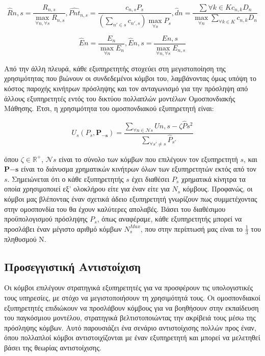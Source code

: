 \[\hat{R}{n,s} = \frac{R_{n,s}}{\max \limits_{\forall n, \forall s} { R_{n,s} }}, \hat{Pnt}_{n,s} = \frac{c_{n,s}P_s}{(\sum \limits_{n'\in s} c_{n',s}) \max \limits_{\forall s} P_s}, \hat{d}{n} = \frac{\sum \limits{\forall k \in K} c_{n,k} D_n}{\max \limits_{\forall n} { \sum \limits_{\forall k \in K} c_{n,k} D_n }}\]

\[\hat{E}{n} = \frac{E_{n}}{\max \limits_{\forall n} { E_{n} }},  \hat{E}{n,s} = \frac{E{n,s}}{\max \limits_{\forall n, \forall s} { E_{n,s} }}\]

Από την άλλη πλευρά, κάθε εξυπηρετητής στοχεύει στη μεγιστοποίηση της χρησιμότητας που βιώνουν οι συνδεδεμένοι κόμβοι του, λαμβάνοντας όμως υπόψη το κόστος παροχής κινήτρων πρόσληψης και τον ανταγωνισμό για την πρόσληψη από άλλους εξυπηρετητές εντός του δικτύου πολλαπλών μοντέλων Ομοσπονδιακής Μάθησης. Έτσι, η χρησιμότητα του ομοσπονδιακού εξυπηρετητή είναι:

\vspace{-5pt}

\begin{equation}
U_s(P_s, \mathbf{P_{-s}}) = \frac{\sum\limits_{\forall n\in \mathcal{N}s} U{n,s} - \zeta \hat{P}s^2}{\sum\limits_{\forall s'\neq s} \hat{P}_{s'}}
\label{eq8}
\end{equation}

\vspace{-5pt}

\noindent
όπου $\zeta \in \mathbb{R}^+$, $\mathcal{N}s$ είναι το σύνολο των κόμβων που επιλέγουν τον εξυπηρετητή $s$, και $\mathbf{P{-s}}$ είναι το διάνυσμα χρηματικών κινήτρων όλων των εξυπηρετητών εκτός από τον $s$. Σημειώνεται ότι ο κάθε εξυπηρετητής $s$ έχει διαθέσει $P_s$ χρηματικά κίνητρα τα οποία χρησιμοποιεί εξ' ολοκλήρου είτε για έναν είτε για $N_s$ κόμβους. Προφανώς, οι κόμβοι μας βλέποντας έναν σχετικά άδειο εξυπηρετητή γνωρίζουν πως συμμετέχοντας στην ομοσπονδία του θα έχουν καλύτερες απολαβές. Βάσει του διαθέσιμου προϋπολογισμού πρόσληψης $P_s$, όπως αναφέραμε, κάθε εξυπηρετητής μπορεί να προσλάβει έναν μέγιστο αριθμό κόμβων $N_s^{Max}$, που στην περίπτωσή μας είναι το $\frac{1}{3}$ του πληθυσμού N.

\subsection{Προσεγγιστική Αντιστοίχιση}

Οι κόμβοι επιλέγουν στρατηγικά εξυπηρετητές για να προσφέρουν τις υπολογιστικές τους υπηρεσίες, με στόχο να μεγιστοποιήσουν τη χρησιμότητά τους. Οι ομοσπονδιακοί εξυπηρετητές επιδιώκουν να προσλάβουν κόμβους για να βοηθήσουν στην εκπαίδευση του παγκόσμιου μοντέλου, στρατηγικά βελτιστοποιώντας την ακρίβειά τους μέσω της πρόσληψης κόμβων. Αυτό παρουσιάζει ένα σενάριο αντιστοίχισης πολλών προς έναν, όπου πολλαπλοί κόμβοι αντιστοιχίζονται με έναν εξυπηρετητή και μπορεί να μελετηθεί βάσει της θεωρίας αντιστοίχισης.

